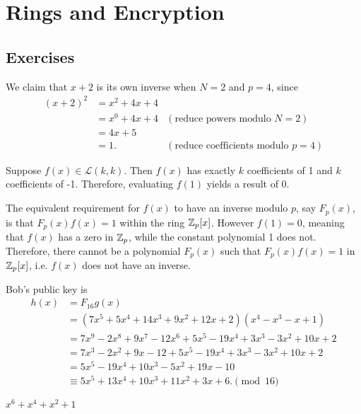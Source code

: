 \section{Rings and Encryption}
\subsection*{Exercises}
\begin{questions}
    \item We claim that $x+2$ is its own inverse when $N = 2$ and $p = 4$, since
    \begin{align*}
        (x+2)^2 &= x^2 + 4x + 4\\
        &= x^0 + 4x + 4 & (\text{reduce powers modulo } N = 2)\\
        &= 4x + 5\\
        &= 1. & (\text{reduce coefficients modulo } p = 4)
    \end{align*}

    \item Suppose $f(x) \in \mathcal{L}(k,k)$. Then $f(x)$ has exactly $k$ coefficients of 1 and $k$ coefficients of -1. Therefore, evaluating $f(1)$ yields a result of 0.

    The equivalent requirement for $f(x)$ to have an inverse modulo $p$, say $F_p(x)$, is that $F_p(x)f(x) = 1$ within the ring $\mathbb{Z}_p[x]$. However $f(1) = 0$, meaning that $f(x)$ has a zero in $\mathbb{Z}_p$, while the constant polynomial 1 does not. Therefore, there cannot be a polynomial $F_p(x)$ such that $F_p(x)f(x) = 1$ in $\mathbb{Z}_p[x]$, i.e. $f(x)$ does not have an inverse.

    \item Bob's public key is
    \begin{align*}
        h(x) &= F_{16}g(x)\\
        &= (7x^5 + 5x^4 + 14x^3 + 9x^2 + 12x + 2)(x^4 - x^3 - x + 1)\\
        &= 7x^9 - 2x^8 + 9x^7 - 12x^6 + 5x^5 - 19x^4 + 3x^3 - 3x^2 + 10x + 2\\
        &= 7x^3 - 2x^2 + 9x - 12 + 5x^5 - 19x^4 + 3x^3 - 3x^2 + 10x + 2\\
        &= 5x^5 - 19x^4 + 10x^3 - 5x^2 + 19x - 10\\
        &\equiv 5x^5 + 13x^4 + 10x^3 + 11x^2 + 3x + 6. \pmod{16}
    \end{align*}

    \item $x^6 + x^4 + x^2 + 1$


\end{questions}
